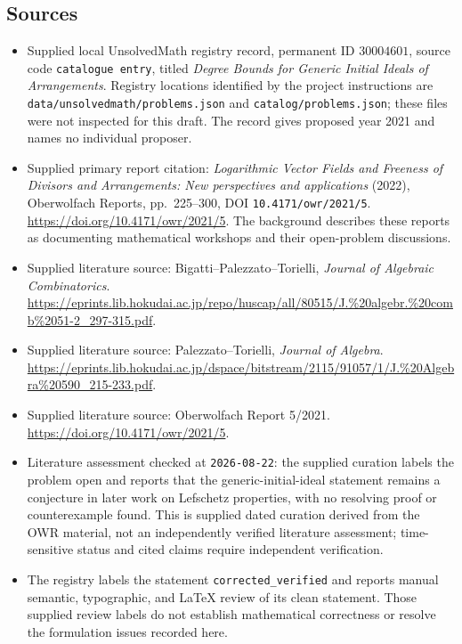 \documentclass[11pt]{article}
\begin{document}
\subsection{Sources}
\begin{itemize}
\item Supplied local UnsolvedMath registry record, permanent ID \(30004601\), source code \texttt{catalogue entry}, titled \emph{Degree Bounds for Generic Initial Ideals of Arrangements}. Registry locations identified by the project instructions are \texttt{data/unsolvedmath/problems.json} and \texttt{catalog/problems.json}; these files were not inspected for this draft. The record gives proposed year 2021 and names no individual proposer.
\item Supplied primary report citation: \emph{Logarithmic Vector Fields and Freeness of Divisors and Arrangements: New perspectives and applications} (2022), Oberwolfach Reports, pp.\ 225--300, DOI \texttt{10.4171/owr/2021/5}. \url{https://doi.org/10.4171/owr/2021/5}. The background describes these reports as documenting mathematical workshops and their open-problem discussions.
\item Supplied literature source: Bigatti--Palezzato--Torielli, \emph{Journal of Algebraic Combinatorics}. \url{https://eprints.lib.hokudai.ac.jp/repo/huscap/all/80515/J.%20algebr.%20comb%2051-2_297-315.pdf}.
\item Supplied literature source: Palezzato--Torielli, \emph{Journal of Algebra}. \url{https://eprints.lib.hokudai.ac.jp/dspace/bitstream/2115/91057/1/J.%20Algebra%20590_215-233.pdf}.
\item Supplied literature source: Oberwolfach Report 5/2021. \url{https://doi.org/10.4171/owr/2021/5}.
\item Literature assessment checked at \texttt{2026-08-22}: the supplied curation labels the problem open and reports that the generic-initial-ideal statement remains a conjecture in later work on Lefschetz properties, with no resolving proof or counterexample found. This is supplied dated curation derived from the OWR material, not an independently verified literature assessment; time-sensitive status and cited claims require independent verification.
\item The registry labels the statement \texttt{corrected\_verified} and reports manual semantic, typographic, and LaTeX review of its clean statement. Those supplied review labels do not establish mathematical correctness or resolve the formulation issues recorded here.
\end{itemize}
\end{document}
